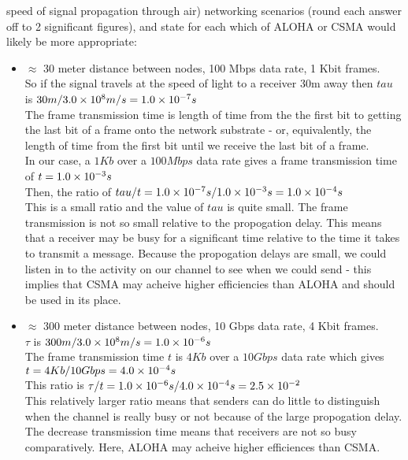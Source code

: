 \documentclass[10pt]{amsart}
\begin{document}
\begin{enumerate}
        speed of signal propagation through air) networking scenarios (round
        each answer off to 2 significant figures), and state for each which of
        ALOHA or CSMA would likely be more appropriate: 
    \begin{itemize}
        \item $\approx$ 30 meter distance between nodes, 100 Mbps data rate, 1
            Kbit frames.\\
            So if the signal travels at the speed of light to a receiver 30m
            away then $tau$ is $30m / \num{3.0E8}m/s = \num{1.0E-7}s$\\
            The frame transmission time is length of time from the the first bit
            to getting the last bit of a frame onto the network substrate - or,
            equivalently, the length of time from the first bit until we receive
            the last bit of a frame.\\
            In our case, a $1Kb$ over a $100 Mbps$ data rate gives a frame
            transmission time of $t = \num{1.0E-3}s$\\
            Then, the ratio of $tau/t = \num{1.0E-7}s / \num{1.0E-3}s =
            \num{1.0E-4}s$\\
            
            This is a small ratio and the value of $tau$ is quite small.  The
            frame transmission is not so small relative to the propogation
            delay.  This means that a receiver may be busy for a significant
            time relative to the time it takes to transmit a message.  Because
            the propogation delays are small, we could listen in to the activity
            on our channel to see when we could send - this implies that CSMA
            may acheive higher efficiencies than ALOHA and should be used in its
            place.
        \item $\approx$ 300 meter distance between nodes, 10 Gbps data rate, 4
            Kbit frames.\\
            $\tau$ is $300m / \num{3.0E8}m/s = \num{1.0E-6}s$\\ 
            The frame transmission time $t$ is $4Kb$ over a $10Gbps$ data rate
            which gives $t = 4Kb / 10Gbps = \num{4.0E-4}s$\\
            This ratio is $\tau/t = \num{1.0E-6}s / \num{4.0E-4}s =
            \num{2.5E-2}$\\
            This relatively larger ratio means that senders can do little to
            distinguish when the channel is really busy or not because of the
            large propogation delay.  The decrease transmission time means that
            receivers are not so busy comparatively.  Here, ALOHA may acheive
            higher efficiences than CSMA.
    \end{itemize}


\end{enumerate}
\end{document}
